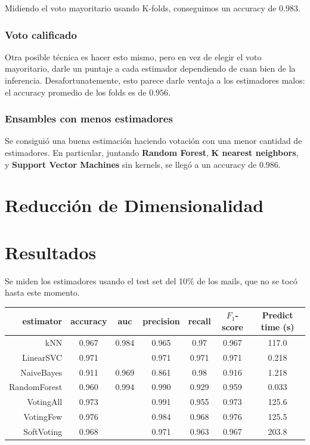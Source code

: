 \documentclass{article}
\begin{document}
Midiendo el voto mayoritario usando K-folds, conseguimos un accuracy de \( 0.983 \).

\subsubsection{Voto calificado}

Otra posible técnica es hacer esto mismo, pero en vez de elegir el voto mayoritario, darle un puntaje a cada estimador dependiendo de cuan bien de la inferencia. Desafortunatemente, esto parece darle ventaja a los estimadores malos: el accuracy promedio de los folds es de \( 0.956 \).

\subsubsection{Ensambles con menos estimadores}

Se consiguió una buena estimación haciendo votación con una menor cantidad de estimadores. En particular, juntando \textbf{Random Forest}, \textbf{K nearest neighbors}, y \textbf{Support Vector Machines} sin kernels, se llegó a un accuracy de \( 0.986 \).

\section{Reducción de Dimensionalidad}



\section{Resultados}

Se miden los estimadores usando el test set del 10\% de los mails, que no se tocó hasta este momento.

\renewcommand{\thefootnote}{\fnsymbol{footnote}}

\begin{center}
\begin{tabular}{r c c c c c c}
	\toprule
	\textbf{estimator} & \textbf{accuracy} & \textbf{auc} & \textbf{precision} & \textbf{recall} & \textbf{\(F_1\)-score} & \textbf{Predict time (s)} \\
	\midrule
	kNN & 0.967 & 0.984 & 0.965 & 0.97 & 0.967 & 117.0 \\
	LinearSVC & 0.971 & \footnotemark[1] & 0.971 & 0.971 & 0.971 & 0.218 \\
	NaiveBayes & 0.911 & 0.969 & 0.861 & 0.98 & 0.916 & 1.218 \\
	RandomForest & 0.960 & 0.994 & 0.990 & 0.929 & 0.959 & 0.033 \\
	VotingAll & 0.973 & \footnotemark[1]  & 0.991 & 0.955 & 0.973 & 125.6 \\
	VotingFew & 0.976 & \footnotemark[1] & 0.984 & 0.968 & 0.976 & 125.5 \\
	SoftVoting & 0.968 & \footnotemark[1] & 0.971 & 0.963 & 0.967 & 203.8 \\
	\bottomrule
\end{tabular}
\end{center}
\end{document}
